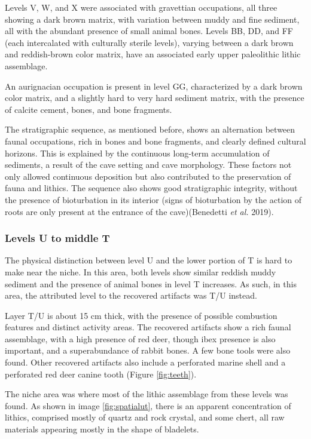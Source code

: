 \documentclass[12pt,twoside]{reedthesis}
\begin{document}
Levels V, W, and X were associated with gravettian occupations, all three showing a dark brown matrix, with variation between muddy and fine sediment, all with the abundant presence of small animal bones. Levels BB, DD, and FF (each intercalated with culturally sterile levels), varying between a dark brown and reddish-brown color matrix, have an associated early upper paleolithic lithic assemblage.

An aurignacian occupation is present in level GG, characterized by a dark brown color matrix, and a slightly hard to very hard sediment matrix, with the presence of calcite cement, bones, and bone fragments.

The stratigraphic sequence, as mentioned before, shows an alternation between faunal occupations, rich in bones and bone fragments, and clearly defined cultural horizons. This is explained by the continuous long-term accumulation of sediments, a result of the cave setting and cave morphology. These factors not only allowed continuous deposition but also contributed to the preservation of fauna and lithics. The sequence also shows good stratigraphic integrity, without the presence of bioturbation in its interior (signs of bioturbation by the action of roots are only present at the entrance of the cave)(Benedetti \emph{et al.} 2019).

\hypertarget{levels-u-to-middle-t}{%
\subsubsection{Levels U to middle T}\label{levels-u-to-middle-t}}

The physical distinction between level U and the lower portion of T is hard to make near the niche. In this area, both levels show similar reddish muddy sediment and the presence of animal bones in level T increases. As such, in this area, the attributed level to the recovered artifacts was T/U instead.

Layer T/U is about 15 cm thick, with the presence of possible combustion features and distinct activity areas. The recovered artifacts show a rich faunal assemblage, with a high presence of red deer, though ibex presence is also important, and a superabundance of rabbit bones. A few bone tools were also found. Other recovered artifacts also include a perforated marine shell and a perforated red deer canine tooth (Figure \ref{fig:teeth}).

The niche area was where most of the lithic assemblage from these levels was found. As shown in image \ref{fig:spatialut}, there is an apparent concentration of lithics, comprised mostly of quartz and rock crystal, and some chert, all raw materials appearing mostly in the shape of bladelets.
\end{document}
